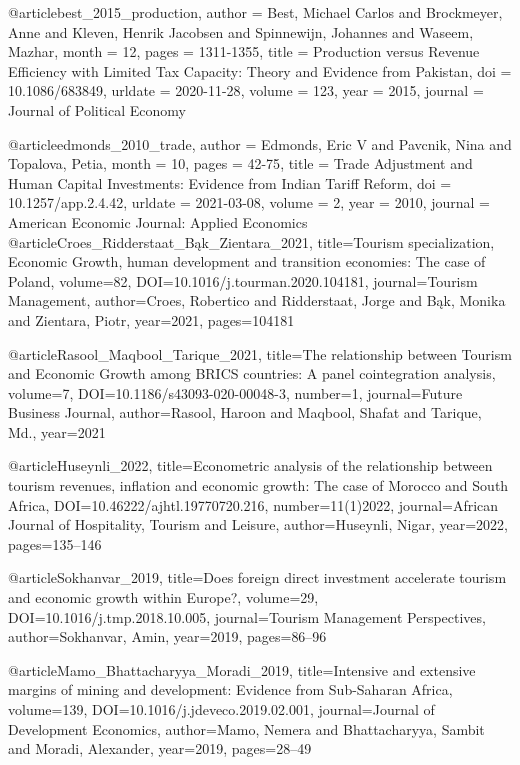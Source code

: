@article{best_2015_production,
	author = {Best, Michael Carlos and Brockmeyer, Anne and Kleven, Henrik Jacobsen and Spinnewijn, Johannes and Waseem, Mazhar},
	month = {12},
	pages = {1311-1355},
	title = {Production versus Revenue Efficiency with Limited Tax Capacity: Theory and Evidence from Pakistan},
	doi = {10.1086/683849},
	urldate = {2020-11-28},
	volume = {123},
	year = {2015},
	journal = {Journal of Political Economy}
}

@article{edmonds_2010_trade,
	author = {Edmonds, Eric V and Pavcnik, Nina and Topalova, Petia},
	month = {10},
	pages = {42-75},
	title = {Trade Adjustment and Human Capital Investments: Evidence from Indian Tariff Reform},
	doi = {10.1257/app.2.4.42},
	urldate = {2021-03-08},
	volume = {2},
	year = {2010},
	journal = {American Economic Journal: Applied Economics}
}
@article{Croes_Ridderstaat_Bąk_Zientara_2021, title={Tourism specialization, Economic Growth, human development and transition economies: The case of Poland}, volume={82}, DOI={10.1016/j.tourman.2020.104181}, journal={Tourism Management}, author={Croes, Robertico and Ridderstaat, Jorge and Bąk, Monika and Zientara, Piotr}, year={2021}, pages={104181}} 

@article{Rasool_Maqbool_Tarique_2021, 
	title={The relationship between Tourism and Economic Growth among BRICS countries: A panel cointegration analysis}, 
	volume={7}, 
	DOI={10.1186/s43093-020-00048-3},
	number={1}, journal={Future Business Journal}, author={Rasool, Haroon and Maqbool, Shafat and Tarique, Md.}, year={2021}} 

@article{Huseynli_2022, title={Econometric analysis of the relationship between tourism revenues, inflation and economic growth: The case of Morocco and South Africa}, DOI={10.46222/ajhtl.19770720.216}, number={11(1)2022}, journal={African Journal of Hospitality, Tourism and Leisure}, author={Huseynli, Nigar}, year={2022}, pages={135–146}} 

@article{Sokhanvar_2019, title={Does foreign direct investment accelerate tourism and economic growth within Europe?}, volume={29}, DOI={10.1016/j.tmp.2018.10.005}, journal={Tourism Management Perspectives}, author={Sokhanvar, Amin}, year={2019}, pages={86–96}} 

@article{Mamo_Bhattacharyya_Moradi_2019, title={Intensive and extensive margins of mining and development: Evidence from Sub-Saharan Africa}, volume={139}, DOI={10.1016/j.jdeveco.2019.02.001}, journal={Journal of Development Economics}, author={Mamo, Nemera and Bhattacharyya, Sambit and Moradi, Alexander}, year={2019}, pages={28–49}} 


